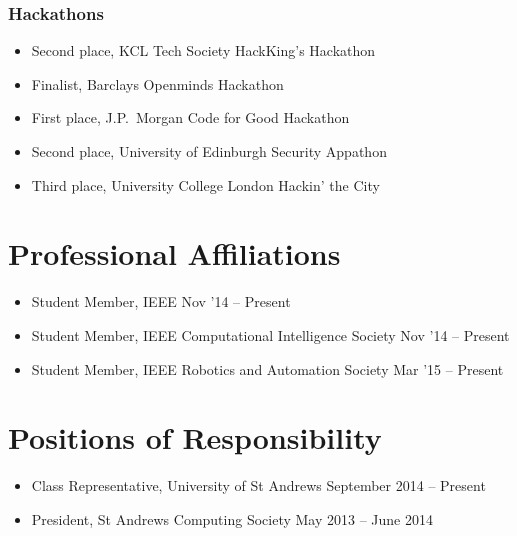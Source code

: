 \documentclass[line,margin]{cv}
\begin{document}
\begin{resume}
\begin{itemize}
\end{itemize}

\subsubsection{Hackathons}

\begin{itemize}

    \item Second place, KCL Tech Society HackKing's Hackathon
    \item Finalist, Barclays Openminds Hackathon
    \item First place, J.P.\ Morgan Code for Good Hackathon
    \item Second place, University of Edinburgh Security Appathon
    \item Third place, University College London Hackin' the City

\end{itemize}

\section{Professional Affiliations}

\begin{itemize}

    \item Student Member, IEEE \hfill Nov '14 -- Present
    \item Student Member, IEEE Computational Intelligence Society
        \hfill Nov '14 -- Present
    \item Student Member, IEEE Robotics and Automation Society
        \hfill Mar '15 -- Present

\end{itemize}

\section{Positions of Responsibility}

\begin{itemize}

    \item Class Representative, University of St Andrews
        \hfill September 2014 -- Present
    \item President, St Andrews Computing Society
        \hfill May 2013 -- June 2014

\end{itemize}


\end{resume}
\end{document}
